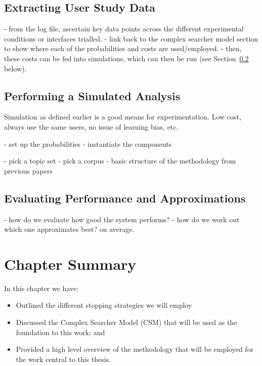 \subsection{Extracting User Study Data}
- from the log file, ascertain key data points across the different experimental conditions or interfaces trialled.
- link back to the complex searcher model section to show where each of the probabilities and costs are used/employed.
- then, these costs can be fed into simulations, which can then be run (see Section~\ref{sec:proposal:method:simulations} below).

\subsection{Performing a Simulated Analysis}\label{sec:proposal:method:simulations}
Simulation as defined earlier is a good means for experimentation.
Low cost, always use the same users, no issue of learning bias, etc.

- set up the probabilities
- instantiate the components

- pick a topic set
- pick a corpus
- basic structure of the methodology from previous papers

\subsection{Evaluating Performance and Approximations}
- how do we evaluate how good the system performs?
- how do we work out which one approximates best? on average.



\section{Chapter Summary}
In this chapter we have:

\begin{itemize}
    
    \item{Outlined the different stopping strategies we will employ}
    \item{Discussed the Complex Searcher Model (CSM) that will be used as the foundation to this work; and}
    \item{Provided a high level overview of the methodology that will be employed for the work central to this thesis.}
    
\end{itemize}